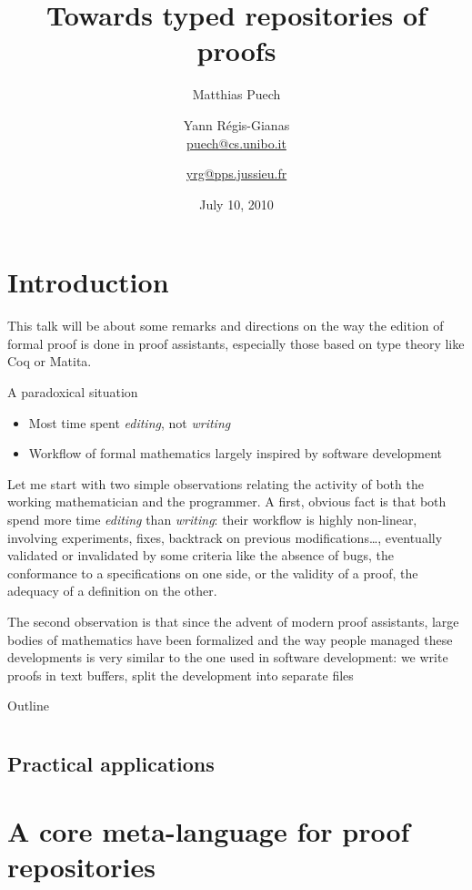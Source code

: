 \documentclass{article} \usepackage{beamerarticle}
\title{Towards typed repositories of proofs}
\date{July 10, 2010}
\author[Matthias Puech \& Yann Régis-Gianas] {
Matthias Puech\inst{1,2} \and Yann Régis-Gianas\inst{2} \\
{\small \url{puech@cs.unibo.it}} \and {\small \url{yrg@pps.jussieu.fr}}
}
\institute {
  \inst 1 {\small Dept. of Computer Science, University of Bologna} \and
  \inst 2 {\small University Paris 7, CNRS, and INRIA, PPS, team ${\pi}r^2$}
}
\begin{document}
\begin{frame}
  \titlepage
\end{frame}
\section*{Introduction}

This talk will be about some remarks and directions on the way the
edition of formal proof is done in proof assistants, especially those
based on type theory like \textsf{Coq} or \textsf{Matita}.

\begin{frame}{A paradoxical situation}
  \begin{itemize}
  \item Most time spent \emph{editing}, not \emph{writing}
  \item Workflow of formal mathematics largely inspired by software development
  \end{itemize}  
\end{frame}

Let me start with two simple observations relating the activity of
both the working mathematician and the programmer. A first, obvious
fact is that both spend more time \emph{editing} than \emph{writing}:
their workflow is highly non-linear, involving experiments, fixes,
backtrack on previous modifications\ldots, eventually validated or
invalidated by some criteria like the absence of bugs, the conformance
to a specifications on one side, or the validity of a proof, the
adequacy of a definition on the other.

The second observation is that since the advent of modern proof
assistants, large bodies of mathematics have been formalized and the
way people managed these developments is very similar to the one used
in software development: we write proofs in text buffers, split the
development into separate files

\begin{frame}{Outline}
  \tableofcontents
\end{frame}

\section{}

\subsection{Practical applications}

\section{A core meta-language for proof repositories}
\end{document}
